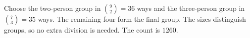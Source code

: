 Choose the two-person group in $\binom92=36$ ways and the three-person group in $\binom73=35$ ways. The remaining four form the final group. The sizes distinguish groups, so no extra division is needed. The count is $\boxed{1260}$.
